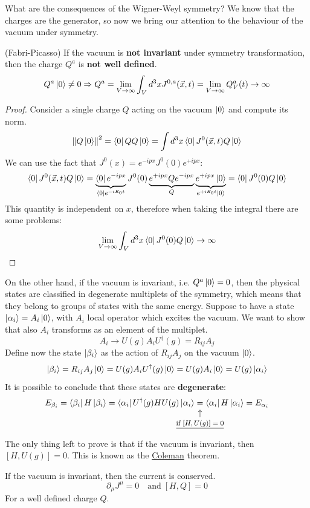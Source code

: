 \documentclass[../main.tex]{subfiles}
\begin{document}
What are the consequences of the Wigner-Weyl symmetry? We know that the charges are the generator, so now we bring our attention to the behaviour of the vacuum under symmetry. 
\begin{theorem}(Fabri-Picasso)
If the vacuum is \textbf{not invariant} under symmetry transformation, then the charge $Q^a$ is \textbf{not well defined}.
\[
Q^a\ket{0}\neq0\Rightarrow Q^a=\lim_{V\to\infty}\int_Vd^3xJ^{0,a}(\Vec{x},t)=\lim_{V\to\infty}Q_V^a(t)\to\infty
\]
\end{theorem}
\begin{proof}
Consider a single charge $Q$ acting on the vacuum $\ket{0}$ and compute its norm.
\[
\norm{Q\ket{0}}^2=\bra{0}QQ\ket{0}=\int d^3x\bra{0}J^0(\Vec{x},t)Q\ket{0}
\]
We can use the fact that $J^0(x)=e^{-ipx}J^0(0)e^{+ipx}$:
\[
\bra{0}J^0(\Vec{x},t)Q\ket{0}=\underbrace{\bra{0}e^{-ipx}}_{\bra{0}e^{-iE_0t}}J^0(0)\underbrace{e^{+ipx}Qe^{-ipx}}_{Q}\underbrace{e^{+ipx}\ket{0}}_{e^{+iE_0t}\ket{0}}=\bra{0}J^0(0)Q\ket{0}
\]
This quantity is independent on $x$, therefore when taking the integral there are some problems:
\[
\lim_{V\to\infty}\int_Vd^3x\bra{0}J^0(0)Q\ket{0}\to\infty
\]
\end{proof}
On the other hand, if the vacuum is invariant, i.e. $Q^a\ket{0}=0$, then the physical states are classified in degenerate multiplets of the symmetry, which means that they belong to groups of states with the same energy. Suppose to have a state $\ket{\alpha_i}=A_i\ket{0}$, with $A_i$ local operator which excites the vacuum. We want to show that also $A_i$ transforms as an element of the multiplet.
\[
A_i\to U(g)A_iU^\dagger(g)=R_{ij}A_j
\]
Define now the state $\ket{\beta_i}$ as the action of $R_{ij}A_j$ on the vacuum $\ket{0}$.
\[
\ket{\beta_i}=R_{ij}A_j\ket{0}=U(g)A_iU^\dagger(g)\ket{0}=U(g)A_i\ket{0}=U(g)\ket{\alpha_i}
\]
It is possible to conclude that these states are \textbf{degenerate}:
\[
E_{\beta_i}=\bra{\beta_i}H\ket{\beta_i}=\bra{\alpha_i}U^\dagger(g)HU(g)\ket{\alpha_i}\underset{\mathclap{\tikz \node {$\uparrow$} node [below=1ex] {\footnotesize \underline{if $[H,U(g)]=0$} };}}{=}\bra{\alpha_i}H\ket{\alpha_i}=E_{\alpha_i}
\]
The only thing left to prove is that if the vacuum is invariant, then $[H,U(g)]=0$. This is known as the \href{https://en.wikipedia.org/wiki/Sidney_Coleman}{Coleman} theorem.
\begin{theorem}[Coleman]
If the vacuum is invariant, then the current is conserved.
\[
\partial_\mu J^\mu=0 \quad \text{and}\;[H,Q]=0
\]
For a well defined charge $Q$.
\end{theorem}
\end{document}

